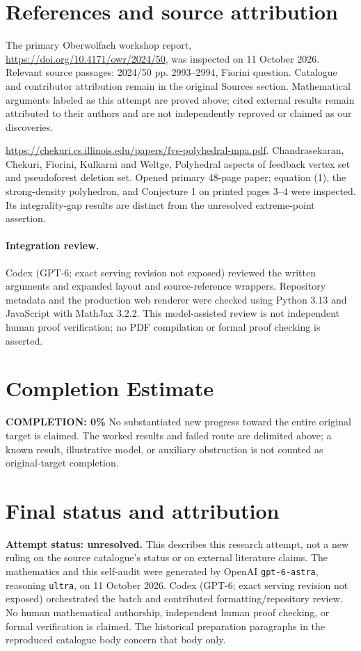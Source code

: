\documentclass[11pt]{article}
\begin{document}
\section{References and source attribution}
The primary Oberwolfach workshop report, \url{https://doi.org/10.4171/owr/2024/50}, was inspected on 11 October 2026. Relevant source passages: 2024/50 pp. 2993--2994, Fiorini question. Catalogue and contributor attribution remain in the original Sources section. Mathematical arguments labeled as this attempt are proved above; cited external results remain attributed to their authors and are not independently reproved or claimed as our discoveries.

\url{https://chekuri.cs.illinois.edu/papers/fvs-polyhedral-mpa.pdf}. Chandrasekaran, Chekuri, Fiorini, Kulkarni and Weltge, Polyhedral aspects of feedback vertex set and pseudoforest deletion set. Opened primary 48-page paper; equation (1), the strong-density polyhedron, and Conjecture 1 on printed pages 3--4 were inspected. Its integrality-gap results are distinct from the unresolved extreme-point assertion.


\paragraph{Integration review.} Codex (GPT-6; exact serving revision not exposed) reviewed the written arguments and expanded layout and source-reference wrappers. Repository metadata and the production web renderer were checked using Python 3.13 and JavaScript with MathJax 3.2.2. This model-assisted review is not independent human proof verification; no PDF compilation or formal proof checking is asserted.

\section{Completion Estimate}
\noindent\textbf{COMPLETION: 0\%}
No substantiated new progress toward the entire original target is claimed. The worked results and failed route are delimited above; a known result, illustrative model, or auxiliary obstruction is not counted as original-target completion.

\section{Final status and attribution}
\textbf{Attempt status: unresolved.} This describes this research attempt, not a new ruling on the source catalogue's status or on external literature claims.
The mathematics and this self-audit were generated by OpenAI \texttt{gpt-6-astra}, reasoning \texttt{ultra}, on 11 October 2026. Codex (GPT-6; exact serving revision not exposed) orchestrated the batch and contributed formatting/repository review. No human mathematical authorship, independent human proof checking, or formal verification is claimed. The historical preparation paragraphs in the reproduced catalogue body concern that body only.
\end{document}
